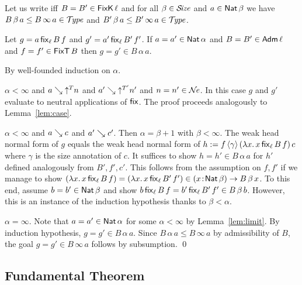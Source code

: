 \documentclass[acmlarge,review,anonymous]{acmart}\settopmatter{printfolios=true}
\makeatletter
\newenvironment{proof*}[1][\proofname]{\par
  \normalfont \topsep6\p@\@plus6\p@\relax
  \trivlist
  \item[\@proofindent\hskip\labelsep
        {\@proofnamefont #1\@addpunct{.}}]\ignorespaces
}{%
  \endtrivlist\@endpefalse
}
\makeatother
\begin{document}
Let us write  iff $B = B' \in \FixK\,\ell$ and
for all $\beta \in \SIZE$ and $a \in \Nat \beta$ we have
$B\,\beta\, a \leq B\,\infty\,a \in \TYPE$ and
$B'\,\beta\, a \leq B'\,\infty\,a \in \TYPE$.
\begin{lemma}[Fix]
Let $g = a \, \fix[\ell] B f$ and $g' = a'\,\fix[\ell]{B'}{f'}$.
If\/ $a = a' \in \Nat \alpha$
and $B = B' \in \Adm\ell$
and $f = f' \in \FixT\,B$
then $g = g' \in B\,\alpha\,a$.
\end{lemma}
\begin{proof*}
By well-founded induction on $\alpha$.
\begin{caselist}

\nextcase $\alpha < \infty$ and $a \evalsto \up{T}n$ and $a' \evalsto \up{T'}{n'}$ and $n = n' \in \NE$.
In this case $g$ and $g'$ evaluate to neutral applications of $\tfix$.  The proof proceeds analogously to Lemma~\ref{lem:case}.

\nextcase $\alpha < \infty$ and $a \evalsto c$ and $a' \evalsto c'$.  Then $\alpha = \beta + 1$ with $\beta<\infty$.
The weak head normal form of $g$ equals the weak head normal form of
$h := f\,\ann \gamma\,(\lambda x.\,x\,\fix[\ell] B f)\,c$ where $\gamma$ is the size annotation of $c$.
It suffices to show $h = h' \in B\,\alpha\,a$ for $h'$ defined analogously from $B',f',c'$.
This follows from the assumption on $f, f'$ if we manage to show
$(\lambda x.\,x\,\fix[\ell] B f) = (\lambda x.\,x\,\fix[\ell] {B'} {f'}) \in
\funT x {\Nat\beta} {B\,\beta\,x}$.
To this end, assume $b = b' \in \Nat\beta$ and show
$b\,\fix[\ell] B f = b'\,\fix[\ell] {B'} {f'} \in B\,\beta\,b$.
However, this is an instance of the induction hypothesis thanks to $\beta < \alpha$.


\nextcase $\alpha = \infty$.
Note that $a = a' \in \Nat \alpha$ for some $\alpha < \infty$ by Lemma~\ref{lem:limit}.
By induction hypothesis, $g = g' \in B\,\alpha\,a$.  Since
$B\,\alpha\,a \leq B\,\infty\,a$ by admissibility of $B$, the goal
$g = g' \in B\,\infty\,a$ follows by subsumption.
\qed
\end{caselist}
\end{proof*}

\subsection{Fundamental Theorem}
\label{sec:fund}
\end{document}
